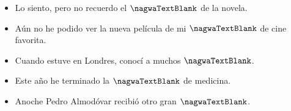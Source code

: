 \begin{question}
\begin{itemize}
\item Lo siento, pero no recuerdo el $\nagwaTextBlank$ de la novela.
\item Aún no he podido ver la nueva película de mi $\nagwaTextBlank$ de cine favorita.
\item Cuando estuve en Londres, conocí a muchos $\nagwaTextBlank$.
\item Este año he terminado la $\nagwaTextBlank$ de medicina.
\item Anoche Pedro Almodóvar recibió otro gran $\nagwaTextBlank$.
\end{itemize}\vspace*{60pt}


\begin{center}
	\end{center}
\end{question}